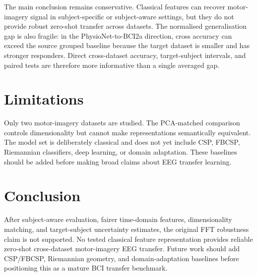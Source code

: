 \documentclass[10pt,twocolumn]{article}
\begin{document}
The main conclusion remains conservative. Classical features can recover
motor-imagery signal in subject-specific or subject-aware settings, but they do
not provide robust zero-shot transfer across datasets. The normalised
generalisation gap is also fragile: in the PhysioNet-to-BCI2a direction, cross
accuracy can exceed the source grouped baseline because the target dataset is
smaller and has stronger responders. Direct cross-dataset accuracy,
target-subject intervals, and paired tests are therefore more informative than
a single averaged gap.

\section{Limitations}
Only two motor-imagery datasets are studied. The PCA-matched comparison
controls dimensionality but cannot make representations semantically
equivalent. The model set is deliberately classical and does not yet include
CSP, FBCSP, Riemannian classifiers, deep learning, or domain adaptation. These
baselines should be added before making broad claims about EEG transfer
learning.

\section{Conclusion}
After subject-aware evaluation, fairer time-domain features, dimensionality
matching, and target-subject uncertainty estimates, the original FFT robustness
claim is not supported. No tested classical feature representation provides
reliable zero-shot cross-dataset motor-imagery EEG transfer. Future work should
add CSP/FBCSP, Riemannian geometry, and domain-adaptation baselines before
positioning this as a mature BCI transfer benchmark.
\end{document}
